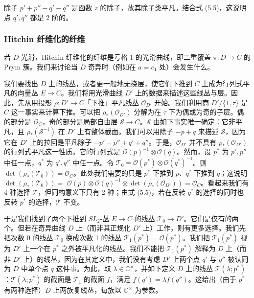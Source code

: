除子 $p'+p''-q'-q''$ 是函数 $z$ 的除子，故其除子类平凡。结合式 (5.5)，这说明点 $q',q''$ 都是 2 阶的。

\subsubsection{Hitchin 纤维化的纤维}

若 $D$ 光滑，Hitchin 纤维化的纤维是亏格 1 的光滑曲线，即二重覆盖 $\pi: D\to C$ 的 Prym 簇。我们来讨论当 $D$ 奇异时（例如在 $a=e_1$ 处）会发生什么。

我们要找出 $D$ 上的线丛，或者更一般地无挠层，使它们下推到 $C$ 上成为行列式平凡的向量丛 $E\to C$。我们将用光滑曲线 $D'$ 上的数据来描述这些线丛与层。因此，先从用投影 $\rho: D'\to C$「下推」平凡线丛 $\mathcal{O}_{D'}$ 开始。我们利用商 $D'/\{1,\tau\}$ 是 $C$ 这一事实来计算下推。可以把 $\rho_*(\mathcal{O}_{D'})$ 分解为在 $\tau$ 下为偶或为奇的子层。偶的部分是 $\mathcal{O}_C$，奇的部分是局部自由层 $\mathcal{S}\to C$。$\mathcal{S}$ 由如下事实唯一确定：它非平凡，且 $\rho_*(\mathcal{S}^{-1})$ 在 $D'$ 上有整体截面。我们可以用除子 $-p+q$ 来描述 $\mathcal{S}$，因为它在 $D'$ 上的拉回是平凡除子 $-p'-p''+q'+q''$。于是，$\mathcal{O}_{D'}$ 并不具有 $\rho_*(\mathcal{O}_{D'})$ 的行列式平凡这一性质。它的行列式是 $\mathcal{O}(p)^{-1}\otimes\mathcal{O}(q)$。然而，设 $p^*$ 为 $p',p''$ 中任一点，$q^*$ 为 $q',q''$ 中任一点。令 $\mathcal{T}_0 = \mathcal{O}(p^*)\otimes\mathcal{O}(q^*)^{-1}$。则 $\det(\rho_*(\mathcal{T}_0)) = \mathcal{O}_C$。此处我们需要的只是 $p^*$ 下推到 $p$、$q^*$ 下推到 $q$；这说明 $\det(\rho_*(\mathcal{T}_0)) =$
$\mathcal{O}(p)\otimes\mathcal{O}(q)^{-1}\otimes\det(\rho_*(\mathcal{O}_{D'})) = \mathcal{O}_C$。看起来我们有 4 种选择 $\mathcal{T}$，但同构意义下只有 2 种；由式 (5.5)，若在反转 $q^*$ 的选择的同时也反转 $p^*$ 的选择，$\mathcal{T}$ 不变。


于是我们找到了两个下推到 $SL_2$-丛 $E\to C$ 的线丛 $\mathcal{T}_0\to D'$。它们是仅有的两个。但若在奇异曲线 $D$ 上（而非其正规化 $D'$ 上）工作，则有更多选择。我们先把次数 0 的线丛 $\mathcal{T}_0$ 换成次数 1 的线丛 $\mathcal{T}_1(p^*) = \mathcal{O}(p^*)$。我们把 $\mathcal{T}_1(p^*)$ 视为 $D'$ 上一个在 $p^*$ 之外被平凡化的线丛。我们不能把 $\mathcal{T}_1(p^*)$ 解释为 $D$ 上（而非 $D'$ 上）的线丛，因为在其定义中，我们没有考虑 $D'$ 上两个点 $q'$ 与 $q''$ 被认同为 $D$ 中单个点 $q$ 这件事。为此，取 $\lambda\in\mathbb{C}^\times$，并如下定义 $D$ 上的线丛 $\mathcal{T}(\lambda;p^*)$：$\mathcal{T}(\lambda;p^*)$ 的截面是 $\mathcal{T}_1$ 的截面 $f$，满足 $f(q') = \lambda f(q'')$。这给出（由于 $p^*$ 有两种选择）$D$ 上两族复线丛，每族以 $\mathbb{C}^\times$ 为参数。

